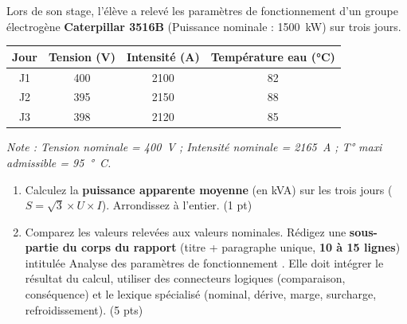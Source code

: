 \documentclass[11pt]{article}
\begin{document}
\begin{exercice}
Lors de son stage, l'élève a relevé les paramètres de fonctionnement d'un groupe électrogène \textbf{Caterpillar 3516B} (Puissance nominale : \SI{1500}{kW}) sur trois jours.

\begin{center}
\begin{tabular}{|c|c|c|c|}
\hline
\textbf{Jour} & \textbf{Tension (V)} & \textbf{Intensité (A)} & \textbf{Température eau (°C)} \\
\hline
J1 & 400 & 2100 & 82 \\
\hline
J2 & 395 & 2150 & 88 \\
\hline
J3 & 398 & 2120 & 85 \\
\hline
\end{tabular}
\end{center}
\textit{Note : Tension nominale = \SI{400}{V} ; Intensité nominale = \SI{2165}{A} ; T° maxi admissible = \SI{95}{°C}.}

\begin{enumerate}
    \item Calculez la \textbf{puissance apparente moyenne} (en kVA) sur les trois jours ($S = \sqrt{3} \times U \times I$). Arrondissez à l'entier. (1 pt)
    \item Comparez les valeurs relevées aux valeurs nominales. Rédigez une \textbf{sous-partie du corps du rapport} (titre + paragraphe unique, \textbf{10 à 15 lignes}) intitulée \og Analyse des paramètres de fonctionnement \fg. Elle doit intégrer le résultat du calcul, utiliser des connecteurs logiques (comparaison, conséquence) et le lexique spécialisé (nominal, dérive, marge, surcharge, refroidissement). (5 pts)
\end{enumerate}
\end{exercice}
\end{document}
